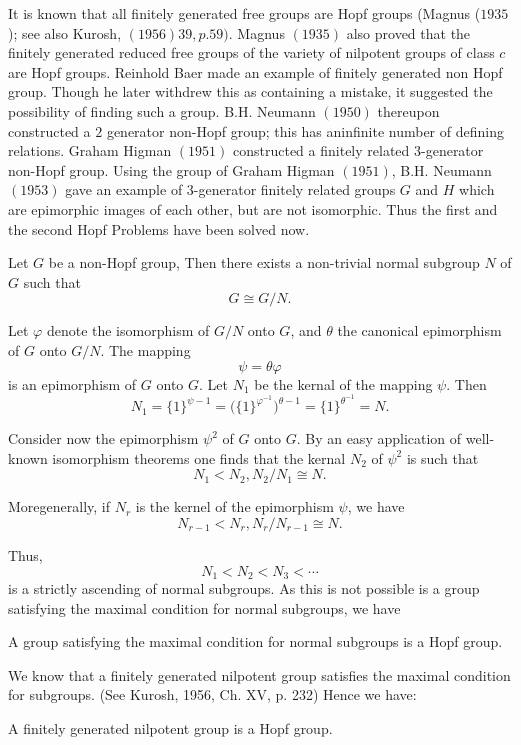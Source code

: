 It is known that all finitely generated free groups are Hopf groups
(Magnus ($1935$); see also Kurosh,  $(1956) 39, p. 59)$. Magnus
$(1935)$ also proved that the finitely generated reduced free groups
of the variety of nilpotent groups of class $c$ are Hopf
groups. Reinhold Baer made an example of finitely generated non Hopf
group. Though he later withdrew this as containing a mistake, it
suggested the possibility of finding such a group. B.H. Neumann
$(1950)$ thereupon constructed a $2$ generator non-Hopf group; this
has an\pageoriginale infinite number of defining relations. Graham Higman $(1951)$
constructed a finitely related $3$-generator non-Hopf group. Using the
group of Graham Higman $(1951)$, B.H. Neumann $(1953)$ gave an example
of $3$-generator finitely related groups $G$ and $H$ which are
epimorphic images of each other, but are not isomorphic. Thus the
first and the second Hopf Problems have been solved
now. 

Let $G$ be a non-Hopf group, Then there exists a non-trivial normal
subgroup $N$ of $G$ such that  
$$
G \cong G/N. 
$$ 

Let $\varphi$ denote the isomorphism of $G/N$ onto $G$, and $\theta$
the canonical epimorphism of $G$ onto $G/N$. The mapping 
$$
\psi = \theta \varphi 
$$ 
is an epimorphism of $G$ onto $G$. Let $N_1$ be the kernal of the
mapping $\psi$. Then  
$$
N_1 = \{ 1\}^{\psi -1} =  \bigg( \{ 1\}^{\varphi ^{-1}}\bigg)^{\theta
  -1}  = \{ 1\}^{\theta ^{-1}} =N. 
$$

Consider now the epimorphism $\psi^2$ of $G$ onto $G$. By an easy
application  of well-known isomorphism theorems one finds that the
kernal $N_2$ of $\psi^2$ is such that 
$$
N_1 <N_2, N_2 /N_1 \cong N.
$$

More\pageoriginale generally, if $N_r$ is the kernel of the epimorphism $\psi$, we have 
$$
N_{r-1} < N_r, N_r/ N_{r-1} \cong N.
$$

Thus,
$$
N_1 <  N_2 < N_3 < \cdots 
$$
is a strictly  ascending of normal subgroups. As this is not possible
is a group satisfying the maximal condition for normal subgroups, we
have  
\setcounter{theorem}{0}
\begin{theorem}\label{chap12:sec1:thm1}%
  A group satisfying the maximal condition for normal subgroups is a
  Hopf group.  
\end{theorem}

We know that a finitely generated nilpotent group satisfies the
maximal condition for subgroups. (See Kurosh, 1956, Ch. XV,
p. 232) Hence we have: 
\setcounter{corollary}{0}
\begin{corollary}\label{chap12:sec1:coro1}%
  A finitely generated nilpotent group is a Hopf group.
\end{corollary}

